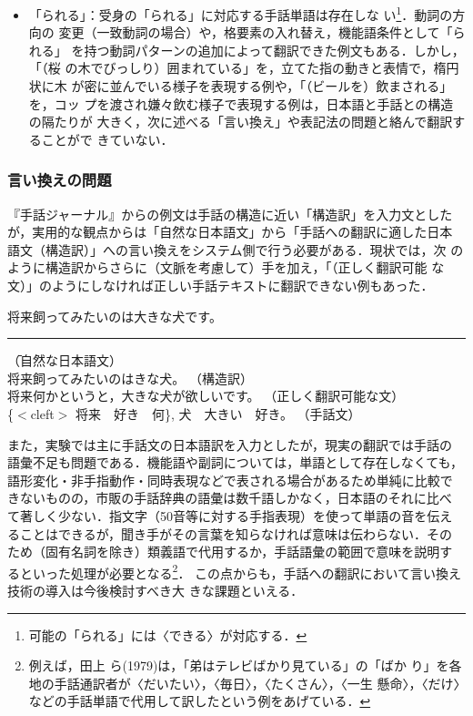 \documentclass[japanese]{jnlp_1.4}
\let\underline
\newenvironment{ex}{}{}
\begin{document}
\begin{itemize}
\item 「られる」：受身の「られる」に対応する手話単語は存在しな
  い\footnote{可能の「られる」には〈できる〉が対応する．}．動詞の方向の
  変更（一致動詞の場合）や，格要素の入れ替え，機能語条件として「られる」
  を持つ動詞パターンの追加によって翻訳できた例文もある．しかし，「（桜
  の木でびっしり）囲まれている」を，立てた指の動きと表情で，楕円状に木
  が密に並んでいる様子を表現する例や，「（ビールを）飲まされる」を，コッ
  プを渡され嫌々飲む様子で表現する例は，日本語と手話との構造の隔たりが
  大きく，次に述べる「言い換え」や表記法の問題と絡んで翻訳することがで
  きていない．

\end{itemize}


\subsubsection{言い換えの問題}

『手話ジャーナル』からの例文は手話の構造に近い「構造訳」を入力文とした
が，実用的な観点からは「自然な日本語文」から「手話への翻訳に適した日本
語文（構造訳）」への言い換えをシステム側で行う必要がある．現状では，次
のように構造訳からさらに（文脈を考慮して）手を加え，「（正しく翻訳可能
な文）」のようにしなければ正しい手話テキストに翻訳できない例もあった．

\begin{ex}
   \> 将来飼ってみたいのは大きな犬です。  \> \rule{16zw}{0pt} \=
  （自然な日本語文） \\
   \>  将来飼ってみたいのは\underline{何かというと}，大きな犬\underline{が欲しい}です。
  \>\> （構造訳）  \\
  \>  将来\underline{欲しい}のは何かというと，大きな犬が欲しいです。
   \>\> （正しく翻訳可能な文） \\
    \> \{$<$cleft$>$ 将来　好き　何\}, 犬　大きい　好き。
   \>\> （手話文）
\end{ex}

また，実験では主に手話文の日本語訳を入力としたが，現実の翻訳では手話の
語彙不足も問題である．機能語や副詞については，単語として存在しなくても，
語形変化・非手指動作・同時表現などで表される場合があるため単純に比較で
きないものの，市販の手話辞典の語彙は数千語しかなく，日本語のそれに比べ
て著しく少ない．指文字（50音等に対する手指表現）を使って単語の音を伝え
ることはできるが，聞き手がその言葉を知らなければ意味は伝わらない．その
ため（固有名詞を除き）類義語で代用するか，手話語彙の範囲で意味を説明す
るといった処理が必要となる\footnote{例えば，田上
  ら(1979)\nocite{Tanokami1979}は，「弟はテレビばかり見ている」の「ばか
  り」を各地の手話通訳者が〈だいたい〉，〈毎日〉，〈たくさん〉，〈一生
  懸命〉，〈だけ〉などの手話単語で代用して訳したという例をあげている．}．
この点からも，手話への翻訳において言い換え技術の導入は今後検討すべき大
きな課題といえる．
\end{document}
